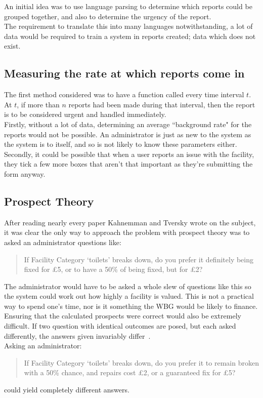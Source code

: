 An initial idea was to use language parsing to determine which reports could be grouped together, and also to determine the urgency of the report. \\

The requirement to translate this into many languages notwithstanding, a lot of data would be required to train a system in reports created; data which does not exist.

\subsection{Measuring the rate at which reports come in}
The first method considered was to have a function called every time interval $t$. At $t$, if more than $n$ reports had been made during that interval, then the report is to be considered urgent and handled immediately. \\

Firstly, without a lot of data, determining an average ``background rate" for the reports would not be possible. An administrator is just as new to the system as the system is to itself, and so is not likely to know these parameters either. \\

Secondly, it could be possible that when a user reports an issue with the facility, they tick a few more boxes that aren't that important as they're submitting the form anyway.

\subsection{Prospect Theory}
After reading nearly every paper Kahnemman and Tversky wrote on the subject, it was clear the only way to approach the problem with prospect theory was to asked an administrator questions like:

\begin{quotation}
If Facility Category `toilets' breaks down, do you prefer it definitely being fixed for £5, or to have a 50\% of being fixed, but for £2?
\end{quotation}

The administrator would have to be asked a whole slew of questions like this so the system could work out how highly a facility is valued. This is not a practical way to spend one's time, nor is it something the \gls{WBG} would be likely to finance. \\

Ensuring that the calculated prospects were correct would also be extremely difficult. If two question with identical outcomes are posed, but each asked differently, the answers given invariably differ~\cite{prospect}. \\

Asking an administrator:
\begin{quotation}
If Facility Category `toilets' breaks down, do you prefer it to remain broken with a 50\% chance, and repairs cost £2, or a guaranteed fix for £5?
\end{quotation}

could yield completely different answers.